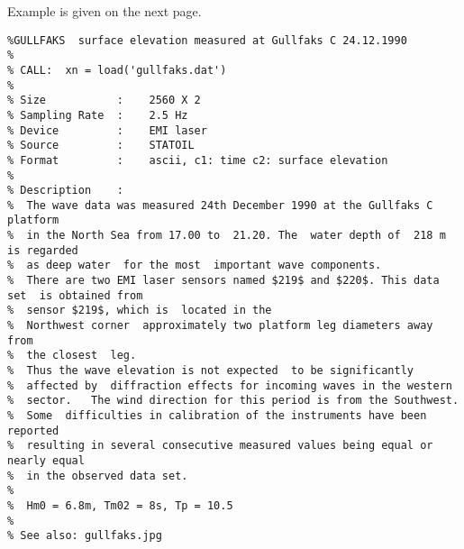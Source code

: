 \documentclass[10pt,a4paper]{article}   %
\begin{document}
Example is given on the next page.
\newpage{}
\begin{verbatim}
%GULLFAKS  surface elevation measured at Gullfaks C 24.12.1990
%              
% CALL:  xn = load('gullfaks.dat')
%  
% Size           :    2560 X 2
% Sampling Rate  :    2.5 Hz
% Device         :    EMI laser
% Source         :    STATOIL 
% Format         :    ascii, c1: time c2: surface elevation
%
% Description    :
%  The wave data was measured 24th December 1990 at the Gullfaks C platform  
%  in the North Sea from 17.00 to  21.20. The  water depth of  218 m is regarded 
%  as deep water  for the most  important wave components.
%  There are two EMI laser sensors named $219$ and $220$. This data  set  is obtained from
%  sensor $219$, which is  located in the
%  Northwest corner  approximately two platform leg diameters away from   
%  the closest  leg. 
%  Thus the wave elevation is not expected  to be significantly 
%  affected by  diffraction effects for incoming waves in the western
%  sector.   The wind direction for this period is from the Southwest. 
%  Some  difficulties in calibration of the instruments have been reported
%  resulting in several consecutive measured values being equal or nearly equal 
%  in the observed data set.
% 
%  Hm0 = 6.8m, Tm02 = 8s, Tp = 10.5
%
% See also: gullfaks.jpg
\end{verbatim}
\end{document}
